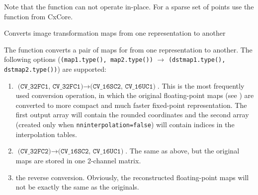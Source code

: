 Note that the function can not operate in-place.
For a sparse set of points use the  function from CxCore.

\fi

\ifCpp

Converts image transformation maps from one representation to another

\begin{description}
\end{description}

The function converts a pair of maps for  from one representation to another. The following options (\texttt{(map1.type(), map2.type())} $\rightarrow$ \texttt{(dstmap1.type(), dstmap2.type())}) are supported:
\begin{enumerate}
    \item $\texttt{(CV\_32FC1, CV\_32FC1)} \rightarrow \texttt{(CV\_16SC2, CV\_16UC1)}$. This is the most frequently used conversion operation, in which the original floating-point maps (see ) are converted to more compact and much faster fixed-point representation. The first output array will contain the rounded coordinates and the second array (created only when \texttt{nninterpolation=false}) will contain indices in the interpolation tables.   
    \item $\texttt{(CV\_32FC2)} \rightarrow \texttt{(CV\_16SC2, CV\_16UC1)}$. The same as above, but the original maps are stored in one 2-channel matrix.
    \item the reverse conversion. Obviously, the reconstructed floating-point maps will not be exactly the same as the originals.
\end{enumerate} 

